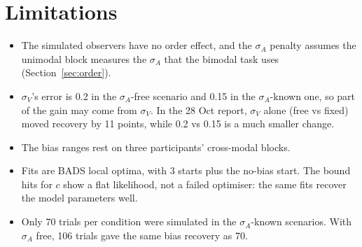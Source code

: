 \documentclass[11pt,a4paper]{article}
\begin{document}
\section{Limitations}
\begin{itemize}
\item The simulated observers have no order effect, and the $\sigma_A$ penalty assumes the unimodal block measures the $\sigma_A$ that the bimodal task uses (Section~\ref{sec:order}).
\item $\sigma_V$'s error is 0.2 in the $\sigma_A$-free scenario and 0.15 in the $\sigma_A$-known one, so part of the gain may come from $\sigma_V$. In the 28 Oct report, $\sigma_V$ alone (free vs fixed) moved recovery by 11 points, while 0.2 vs 0.15 is a much smaller change.
\item The bias ranges rest on three participants' cross-modal blocks.
\item Fits are BADS local optima, with 3 starts plus the no-bias start. The bound hits for $c$ show a flat likelihood, not a failed optimiser: the same fits recover the model parameters well.
\item Only 70 trials per condition were simulated in the $\sigma_A$-known scenarios. With $\sigma_A$ free, 106 trials gave the same bias recovery as 70.
\end{itemize}
\end{document}
